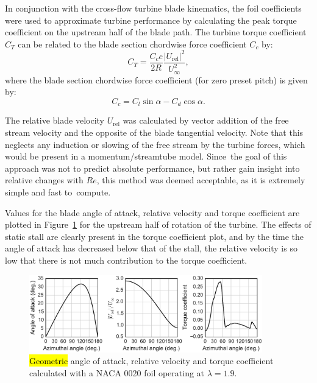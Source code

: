 \documentclass[energies,article,accept,moreauthors,pdftex,10pt,a4paper]{mdpi}
\theoremstyle{mdpi}
\newcounter{ex}
\newcounter{re}
\begin{document}
In conjunction with the cross-flow turbine blade kinematics, the foil
coefficients were used to approximate turbine performance by calculating the
peak torque coefficient on the upstream half of the blade path. The turbine
torque coefficient $C_T$ can be related to the blade section chordwise force
coefficient $C_c$ by:
\begin{equation}
C_T = \frac{C_c c}{2R} \frac{|U_\mathrm{rel}|^2}{U_\infty^2},
\label{eq:ct}
\end{equation}
where the blade section chordwise force coefficient (for zero preset pitch) is
given by:
\begin{equation}
C_c = C_l \sin \alpha - C_d \cos \alpha.
\label{eq:cc}
\end{equation}

The relative blade velocity $U_\mathrm{rel}$ was calculated by vector addition
of the free stream velocity and the opposite of the blade tangential velocity.
Note that this neglects any induction or slowing of the free stream by the
turbine forces, which would be present in a momentum/streamtube model. Since~the
goal of this approach was not to predict absolute performance, but rather gain
insight into relative changes with $Re$, this method was deemed acceptable, as it
is extremely simple and fast to~compute.

Values for the blade angle of attack, relative velocity and torque coefficient
are plotted in Figure~\ref{fig:blade-kinematics} for the upstream half of
rotation of the turbine. The effects of static stall are clearly present in the
torque coefficient plot, and by the time the angle of attack has decreased below
that of the stall, the relative velocity is so low that there is not much
contribution to the torque coefficient.

\begin{figure}[ht!]
\centering

\includegraphics[width=0.9\textwidth]{figures/foil_kinematics_ct}

\caption{\hl {Geometric} angle of attack, relative velocity and torque coefficient
 calculated with a NACA 0020 foil operating at $\lambda=1.9$.}
\label{fig:blade-kinematics}
\end{figure}
\end{document}
